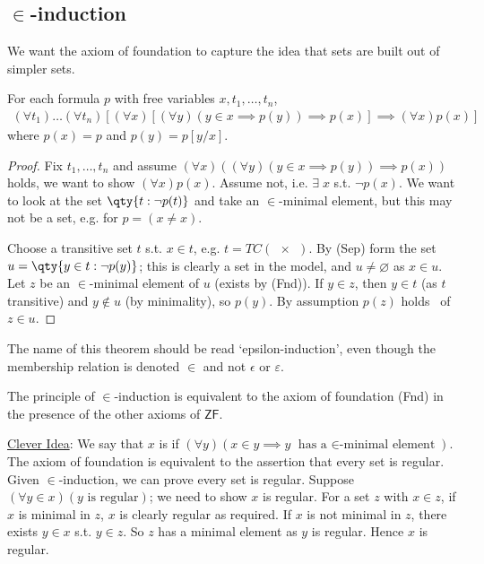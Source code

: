 \subsection{\texorpdfstring{$\in$}{∈}-induction}
We want the axiom of foundation to capture the idea that sets are built out of simpler sets.
\begin{theorem}
    For each formula $p$ with free variables $x, t_1, \dots, t_n$,
    \begin{align*}
        (\forall t_1)\dots(\forall t_n)[(\forall x)[(\forall y)(y \in x \implies p(y)) \implies p(x)] \implies (\forall x)p(x)]
    \end{align*}
    where $p(x) = p$ and $p(y) = p[y/x]$.
\end{theorem}

\begin{proof}
    Fix $t_1, \dots, t_n$ and assume $(\forall x)((\forall y)(y \in x \implies p(y)) \implies p(x))$ holds, we want to show $(\forall x)p(x)$.
    Assume not, i.e. $\exists \; x$ s.t. $\neg p(x)$.
    We want to look at the set $\qty{t : \neg p(t)}$ and take an $\in$-minimal element, but this may not be a set, e.g. for $p = (x \neq x)$.

    Choose a transitive set $t$ s.t. $x \in t$, e.g. $t = TC(\qty{x})$.
    By (Sep) form the set $u = \qty{y \in t : \neg p(y)}$; this is clearly a set in the model, and $u \neq \varnothing$ as $x \in u$.
    Let $z$ be an $\in$-minimal element of $u$ (exists by (Fnd)).
    If $y \in z$, then $y \in t$ (as $t$ transitive) and $y \notin u$ (by minimality), so $p(y)$.
    By assumption $p(z)$ holds \Lightning\ of $z \in u$.
\end{proof}
The name of this theorem should be read `epsilon-induction', even though the membership relation is denoted $\in$ and not $\epsilon$ or $\varepsilon$.

The principle of $\in$-induction is equivalent to the axiom of foundation (Fnd) in the presence of the other axioms of $\mathsf{ZF}$.

\underline{Clever Idea}: We say that $x$ is  if $(\forall y)(x \in y \implies y \text{ has a $\in$-minimal element})$.
The axiom of foundation is equivalent to the assertion that every set is regular.
Given $\in$-induction, we can prove every set is regular.
Suppose $(\forall y \in x)(y \text{ is regular})$; we need to show $x$ is regular.
For a set $z$ with $x \in z$, if $x$ is minimal in $z$, $x$ is clearly regular as required.
If $x$ is not minimal in $z$, there exists $y \in x$ s.t. $y \in z$.
So $z$ has a minimal element as $y$ is regular.
Hence $x$ is regular.

